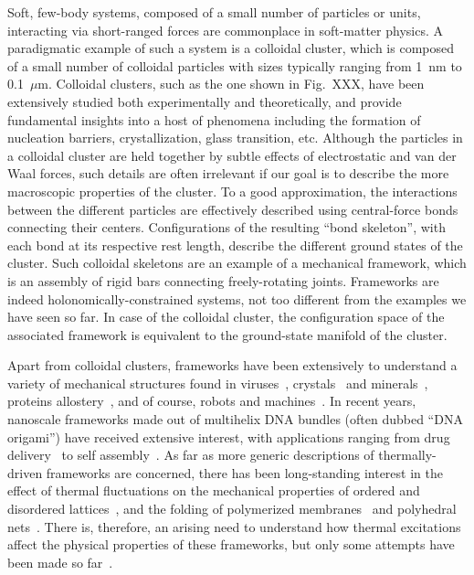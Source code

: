 Soft, few-body systems, composed of a small number of particles or units, interacting via short-ranged forces are commonplace in soft-matter physics.
A paradigmatic example of such a system is a colloidal cluster, which is composed of a small number of colloidal particles with sizes typically ranging from 1~nm to 0.1~$\mu$m.
Colloidal clusters, such as the one shown in Fig.~XXX, have been extensively studied both experimentally and theoretically, and provide fundamental insights into a host of phenomena including the formation of nucleation barriers, crystallization, glass transition, etc.
Although the particles in a colloidal cluster are held together by subtle effects of electrostatic and van der Waal forces, such details are often irrelevant if our goal is to describe the more macroscopic properties of the cluster.
To a good approximation, the interactions between the different particles are effectively described using central-force bonds connecting their centers.
Configurations of the resulting ``bond skeleton'', with each bond at its respective rest length, describe the different ground states of the cluster.
Such colloidal skeletons are an example of a mechanical framework, which is an assembly of rigid bars connecting freely-rotating joints.
Frameworks are indeed holonomically-constrained systems, not too different from the examples we have seen so far.
In case of the colloidal cluster, the configuration space of the associated framework is equivalent to the ground-state manifold of the cluster.

Apart from colloidal clusters, frameworks have been extensively to understand a variety of mechanical structures found in viruses~\cite{hespenheide2004},
crystals~\cite{power2014} and minerals~\cite{kapko2011},
proteins allostery~\cite{gaspar2012}, and of course,
robots and machines~\cite{farber2008,donelan2007}.
In recent years, nanoscale frameworks made out of multihelix DNA bundles (often dubbed ``DNA origami'') have received extensive interest, with applications ranging from drug delivery~\cite{zhao2019} to self assembly~\cite{liedl2010}.
As far as more generic descriptions of thermally-driven frameworks are concerned, there has been long-standing interest in the effect of thermal fluctuations on the mechanical properties of ordered and disordered lattices~\cite{zhang2016,woodhouse2018,yan2018}, and the folding of polymerized membranes~\cite{di-francesco2000,nelson2004} and polyhedral nets~\cite{shenoy2012,dodd2018,melo2020}.
There is, therefore, an arising need to understand how thermal excitations affect the physical properties of these frameworks, but only some attempts have been made so far~\cite{kallus2017,rocklin2018}.

